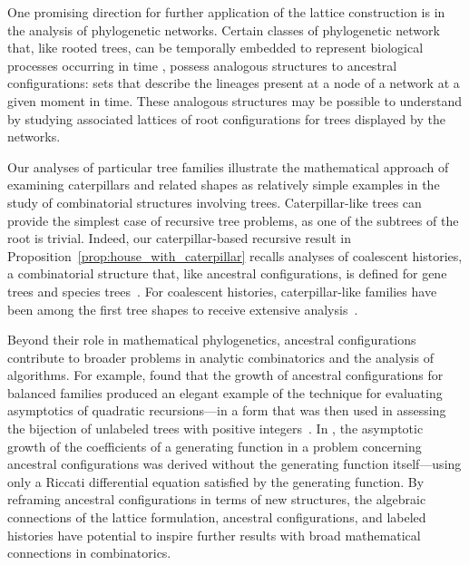 \documentclass[10pt]{article}
\begin{document}
One promising direction for further application of the lattice construction is in the analysis of phylogenetic networks. Certain classes of phylogenetic network that, like rooted trees, can be temporally embedded to represent biological processes occurring in time \citep{bienvenu2022rtcn, Mathur2023}, possess analogous structures to ancestral configurations: sets that describe the lineages present at a node of a network at a given moment in time. These analogous structures may be possible to understand by studying associated lattices of root configurations for trees displayed by the networks.

Our analyses of particular tree families illustrate the mathematical approach of examining caterpillars and related shapes as relatively simple examples in the study of combinatorial structures involving trees. Caterpillar-like trees can provide the simplest case of recursive tree problems, as one of the subtrees of the root is trivial. Indeed, our caterpillar-based recursive result in Proposition~\ref{prop:house_with_caterpillar} recalls analyses of coalescent histories, a combinatorial structure that, like ancestral configurations, is defined for gene trees and species trees~\citep{degnan2005gene, rosenberg2007counting}. For coalescent histories, caterpillar-like families have been among the first tree shapes to receive extensive analysis~\citep{rosenberg2013coalescent,disanto2015asymptotic,himwich2020,alimpiev2021enumeration}.

Beyond their role in mathematical phylogenetics, ancestral configurations contribute to broader problems in analytic combinatorics and the analysis of algorithms. For example, \cite{disanto2017enumeration} found that the growth of ancestral configurations for balanced families produced an elegant example of the \cite{Aho1973} technique for evaluating asymptotics of quadratic recursions---in a form that was then used in assessing the \cite{Colijn2018} bijection of unlabeled trees with positive integers~\citep{Rosenberg2021}. In \cite{disanto2022distributions}, the asymptotic growth of the coefficients of a generating function in a problem concerning ancestral configurations was derived without the generating function itself---using only a Riccati differential equation satisfied by the generating function. By reframing ancestral configurations in terms of new structures, the algebraic connections of the lattice formulation, ancestral configurations, and labeled histories have potential to inspire further results with broad mathematical connections in combinatorics.
\end{document}

